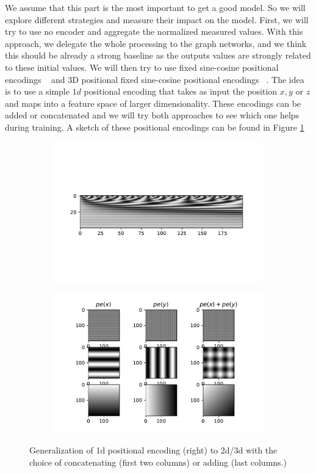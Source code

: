 \documentclass[a4paper,10pt]{article}
\begin{document}
We assume that this part is the most important to get a good model. So we will explore different strategies and measure their impact on the model. First, we will try to use no encoder and aggregate the normalized measured values. With this approach, we delegate the whole processing to the graph networks, and we think this should be already a strong baseline as the outputs values are strongly related to these initial values. We will then try to use fixed sine-cosine positional encodings ~\cite{vaswani2017attention} and 3D positional fixed sine-cosine positional encodings ~\cite{chu2021conditional}. The idea is to use a simple $1d$ positional encoding that takes as input the position $x,y$ or $z$ and maps into a feature space of larger dimensionality. These encodings can be added or concatenated and we will try both approaches to see which one helps during training. A sketch of these positional encodings can be found in Figure \ref{fig:posenc}

\begin{figure}
  \begin{subfigure}{0.4\textwidth}
    \includegraphics[width=\textwidth]{../windgraph/1dposenc}
  \end{subfigure}
  \begin{subfigure}{0.5\textwidth}
    \includegraphics[width=\textwidth]{../windgraph/posenc}
  \end{subfigure}
  \caption{Generalization of 1d positional encoding (right) to 2d/3d with the choice of concatenating (first two columns) or adding (last columns.)}
  \label{fig:posenc}
\end{figure}
\end{document}

